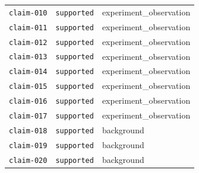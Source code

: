\documentclass[UTF8]{ctexart}
\begin{document}
\begin{longtable}{@{}>{\raggedright\arraybackslash}p{}>{\raggedright\arraybackslash}p{}>{\raggedright\arraybackslash}p{}@{}}
\texttt{\scriptsize claim-\allowbreak{}010} & \texttt{\scriptsize supported} & experiment\_\allowbreak{}observation \\
\texttt{\scriptsize claim-\allowbreak{}011} & \texttt{\scriptsize supported} & experiment\_\allowbreak{}observation \\
\texttt{\scriptsize claim-\allowbreak{}012} & \texttt{\scriptsize supported} & experiment\_\allowbreak{}observation \\
\texttt{\scriptsize claim-\allowbreak{}013} & \texttt{\scriptsize supported} & experiment\_\allowbreak{}observation \\
\texttt{\scriptsize claim-\allowbreak{}014} & \texttt{\scriptsize supported} & experiment\_\allowbreak{}observation \\
\texttt{\scriptsize claim-\allowbreak{}015} & \texttt{\scriptsize supported} & experiment\_\allowbreak{}observation \\
\texttt{\scriptsize claim-\allowbreak{}016} & \texttt{\scriptsize supported} & experiment\_\allowbreak{}observation \\
\texttt{\scriptsize claim-\allowbreak{}017} & \texttt{\scriptsize supported} & experiment\_\allowbreak{}observation \\
\texttt{\scriptsize claim-\allowbreak{}018} & \texttt{\scriptsize supported} & background \\
\texttt{\scriptsize claim-\allowbreak{}019} & \texttt{\scriptsize supported} & background \\
\texttt{\scriptsize claim-\allowbreak{}020} & \texttt{\scriptsize supported} & background \\
\bottomrule
\end{longtable}
\end{document}
